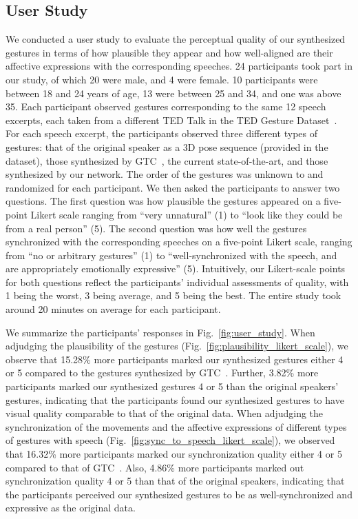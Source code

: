 \documentclass[conference,compsoc]{IEEEtran}
\theoremstyle{definition}
\newcommand{\sota}{state-of-the-art}
\begin{document}
\subsection{User Study}\label{subsec:user_study}
We conducted a user study to evaluate the perceptual quality of our synthesized gestures in terms of how plausible they appear and how well-aligned are their affective expressions with the corresponding speeches. 24 participants took part in our study, of which 20 were male, and 4 were female. 10 participants were between 18 and 24 years of age, 13 were between 25 and 34, and one was above 35. Each participant observed gestures corresponding to the same 12 speech excerpts, each taken from a different TED Talk in the TED Gesture Dataset~\cite{cospeech_gestures}. For each speech excerpt, the participants observed three different types of gestures: that of the original speaker as a 3D pose sequence (provided in the dataset), those synthesized by GTC~\cite{trimodal}, the current \sota, and those synthesized by our network. The order of the gestures was unknown to and randomized for each participant. We then asked the participants to answer two questions. The first question was how plausible the gestures appeared on a five-point Likert scale ranging from ``very unnatural'' (1) to ``look like they could be from a real person'' (5). The second question was how well the gestures synchronized with the corresponding speeches on a five-point Likert scale, ranging from ``no or arbitrary gestures'' (1) to ``well-synchronized with the speech, and are appropriately emotionally expressive'' (5). Intuitively, our Likert-scale points for both questions reflect the participants' individual assessments of quality, with 1 being the worst, 3 being average, and 5 being the best. The entire study took around 20 minutes on average for each participant.

We summarize the participants' responses in Fig.~\ref{fig:user_study}. When adjudging the plausibility of the gestures (Fig.~\ref{fig:plausibility_likert_scale}), we observe that 15.28\% more participants marked our synthesized gestures either 4 or 5 compared to the gestures synthesized by GTC~\cite{trimodal}. Further, 3.82\% more participants marked our synthesized gestures 4 or 5 than the original speakers' gestures, indicating that the participants found our synthesized gestures to have visual quality comparable to that of the original data.
When adjudging the synchronization of the movements and the affective expressions of different types of gestures with speech (Fig.~\ref{fig:sync_to_speech_likert_scale}), we observed that 16.32\% more participants marked our synchronization quality either 4 or 5 compared to that of GTC~\cite{trimodal}. Also, 4.86\% more participants marked out synchronization quality 4 or 5 than that of the original speakers, indicating that the participants perceived our synthesized gestures to be as well-synchronized and expressive as the original data.
\end{document}

